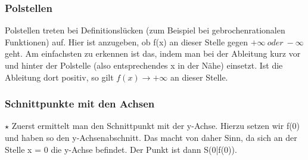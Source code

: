 
	\subsubsection{Polstellen}
		Polstellen treten bei Definitionslücken (zum Beispiel bei gebrochenrationalen
		Funktionen) auf. Hier ist anzugeben, ob f(x) an dieser Stelle gegen \(+\infty\
		oder\ -\infty\) geht. Am einfachsten zu erkennen ist das, indem man bei der
		Ableitung kurz vor und hinter der Polstelle (also entsprechendes x in der
		Nähe) einsetzt. Ist die Ableitung dort positiv, so gilt \(f(x)\rightarrow +
		\infty\) an dieser Stelle.

	\subsubsection{Schnittpunkte mit den Achsen}
		\(\star\) Zuerst ermittelt man den Schnittpunkt mit der y-Achse. Hierzu setzen
		wir f(0) und haben so den y-Achsenabschnitt. Das macht von daher Sinn, da sich
		an der Stelle x = 0 die y-Achse befindet. Der Punkt ist dann S(0|f(0)).\\


